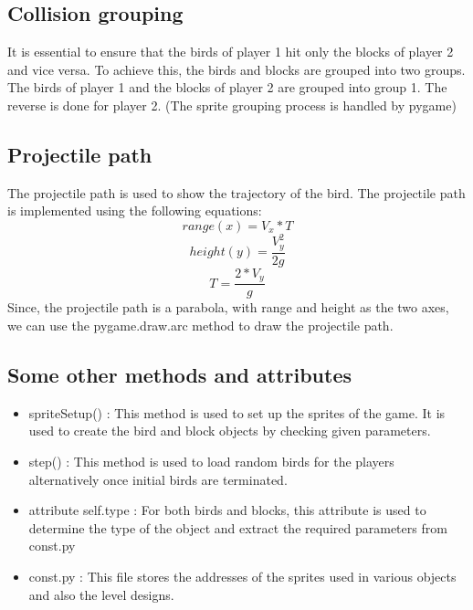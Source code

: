 \documentclass{article}
\begin{document}
\subsection{Collision grouping}
It is essential to ensure that the birds of player 1 hit only the blocks of player 2 and vice versa.
\newline
To achieve this, the birds and blocks are grouped into two groups. The birds of player 1 and the blocks of player 2 are grouped into group 1. The reverse is done for player 2.
(The sprite grouping process is handled by pygame)
\pagebreak
\subsection{Projectile path}
The projectile path is used to show the trajectory of the bird. The projectile path is implemented using the following equations:
\begin{equation}
    range(x) = V_x * T
\end{equation}
\begin{equation}
    height(y) = \frac{V_y^2}{2g}
\end{equation}
\begin{equation}
    T = \frac{2 * V_y}{g}
\end{equation}
Since, the projectile path is a parabola, with range and height as the two axes, we can use the pygame.draw.arc method to draw the projectile path.

\subsection{Some other methods and attributes}
\begin{itemize}
    \item spriteSetup() : This method is used to set up the sprites of the game. It is used to create the bird and block objects by checking given parameters.
    \item step() : This method is used to load random birds for the players alternatively once initial birds are terminated.
    \item attribute self.type : For both birds and blocks, this attribute is used to determine the type of the object and extract the required parameters from const.py
    \item const.py : This file stores the addresses of the sprites used in various objects and also the level designs.
\end{itemize}
\end{document}
